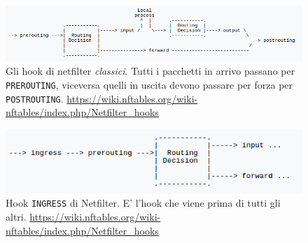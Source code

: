 \begin{figure}
  \includegraphics[scale=0.5]{img/NetfilterHooks}
  \caption[Hook di netfiler]{Gli hook di netfilter \textit{classici}. Tutti i
  pacchetti in arrivo passano per \texttt{PREROUTING}, viceversa quelli in
  uscita devono passare per forza per \texttt{POSTROUTING}.
  \url{https://wiki.nftables.org/wiki-nftables/index.php/Netfilter_hooks}}
  \label{fig:netfiler-hooks}
\end{figure}


\begin{figure}
  \includegraphics[scale=0.5]{img/NetfilterIngress}
  \caption[Hook \texttt{INGRESS}]{Hook \texttt{INGRESS} di Netfilter. E' l'hook
  che viene prima di tutti gli altri.
  \url{https://wiki.nftables.org/wiki-nftables/index.php/Netfilter_hooks}}
  \label{fig:ingress-hooks}
\end{figure}

